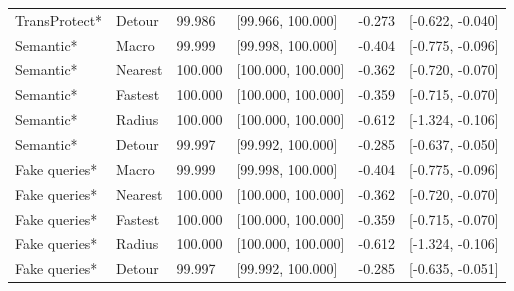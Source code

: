 \begin{longtable}{@{}P{2.5cm}P{1.4cm}P{1.2cm}P{2.6cm}P{1.6cm}P{2.7cm}@{}}
TransProtect* & Detour & 99.986 & [99.966, 100.000] & -0.273 & [-0.622, -0.040] \\
Semantic* & Macro & 99.999 & [99.998, 100.000] & -0.404 & [-0.775, -0.096] \\
Semantic* & Nearest & 100.000 & [100.000, 100.000] & -0.362 & [-0.720, -0.070] \\
Semantic* & Fastest & 100.000 & [100.000, 100.000] & -0.359 & [-0.715, -0.070] \\
Semantic* & Radius & 100.000 & [100.000, 100.000] & -0.612 & [-1.324, -0.106] \\
Semantic* & Detour & 99.997 & [99.992, 100.000] & -0.285 & [-0.637, -0.050] \\
Fake queries* & Macro & 99.999 & [99.998, 100.000] & -0.404 & [-0.775, -0.096] \\
Fake queries* & Nearest & 100.000 & [100.000, 100.000] & -0.362 & [-0.720, -0.070] \\
Fake queries* & Fastest & 100.000 & [100.000, 100.000] & -0.359 & [-0.715, -0.070] \\
Fake queries* & Radius & 100.000 & [100.000, 100.000] & -0.612 & [-1.324, -0.106] \\
Fake queries* & Detour & 99.997 & [99.992, 100.000] & -0.285 & [-0.635, -0.051] \\
\end{longtable}

\endgroup

